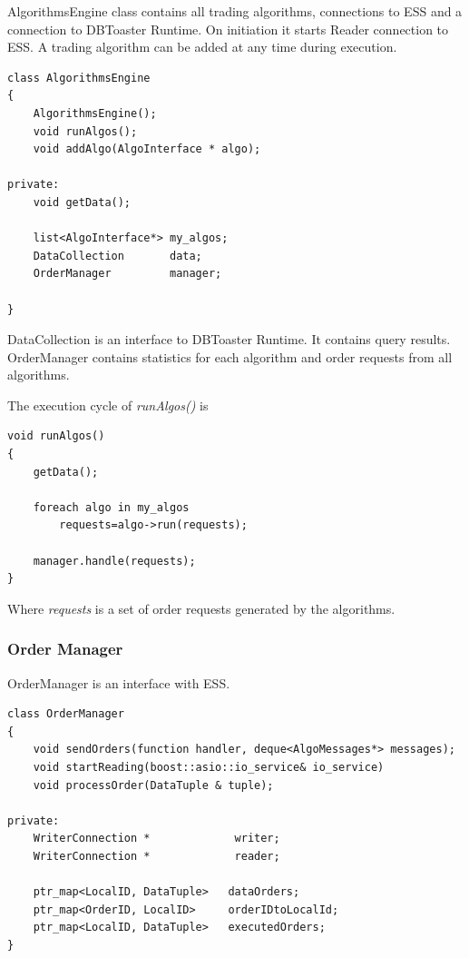 \documentclass[14pt]{article}
\begin{document}
AlgorithmsEngine class contains all trading algorithms, connections to ESS and a connection to DBToaster Runtime. On initiation it starts Reader connection to ESS. A trading algorithm can be added at any time during execution. 

\begin{verbatim}
class AlgorithmsEngine
{
    AlgorithmsEngine();
    void runAlgos();
    void addAlgo(AlgoInterface * algo);

private:
    void getData();
    
    list<AlgoInterface*> my_algos;
    DataCollection       data;
    OrderManager         manager;
	
}
\end{verbatim}

DataCollection is an interface to DBToaster Runtime. It contains query results. OrderManager contains statistics for each algorithm and order requests from all algorithms. 

The execution cycle of \emph{runAlgos()} is

\begin{verbatim}
void runAlgos()
{
    getData();
    
    foreach algo in my_algos
        requests=algo->run(requests);
    
    manager.handle(requests);
}
\end{verbatim}

Where \emph{requests} is a set of order requests generated by the algorithms.


\subsubsection{Order Manager}
OrderManager is an interface with ESS. 

\begin{verbatim}
class OrderManager
{
    void sendOrders(function handler, deque<AlgoMessages*> messages);
    void startReading(boost::asio::io_service& io_service)
    void processOrder(DataTuple & tuple);
    
private:
    WriterConnection *             writer;
    WriterConnection *             reader;

    ptr_map<LocalID, DataTuple>   dataOrders;
    ptr_map<OrderID, LocalID>     orderIDtoLocalId;
    ptr_map<LocalID, DataTuple>   executedOrders;
}
\end{verbatim}
\end{document}
